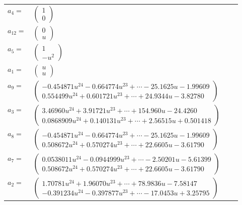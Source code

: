 \documentclass[1p]{elsarticle_modified}
\theoremstyle{definition}
\begin{document}
\begin{tabular}{m{7pt} m{180pt} m{7pt} m{180pt} }
\flushright $a_{4}=$&$\begin{pmatrix}1\\0\end{pmatrix}$ \\
\flushright $a_{12}=$&$\begin{pmatrix}0\\u\end{pmatrix}$ \\
\flushright $a_{5}=$&$\begin{pmatrix}1\\- u^2\end{pmatrix}$ \\
\flushright $a_{1}=$&$\begin{pmatrix}u\\u\end{pmatrix}$ \\
\flushright $a_{9}=$&$\begin{pmatrix}-0.454871 u^{24}-0.664774 u^{23}+\cdots-25.1625 u-1.99609\\0.554499 u^{24}+0.601721 u^{23}+\cdots+24.9344 u-3.82780\end{pmatrix}$ \\
\flushright $a_{3}=$&$\begin{pmatrix}3.46960 u^{24}+3.91721 u^{23}+\cdots+154.960 u-24.4260\\0.0868909 u^{24}+0.140131 u^{23}+\cdots+2.56515 u+0.501418\end{pmatrix}$ \\
\flushright $a_{8}=$&$\begin{pmatrix}-0.454871 u^{24}-0.664774 u^{23}+\cdots-25.1625 u-1.99609\\0.508672 u^{24}+0.570274 u^{23}+\cdots+22.6605 u-3.61790\end{pmatrix}$ \\
\flushright $a_{7}=$&$\begin{pmatrix}0.0538011 u^{24}-0.0944999 u^{23}+\cdots-2.50201 u-5.61399\\0.508672 u^{24}+0.570274 u^{23}+\cdots+22.6605 u-3.61790\end{pmatrix}$ \\
\flushright $a_{2}=$&$\begin{pmatrix}1.70781 u^{24}+1.96070 u^{23}+\cdots+78.9836 u-7.58147\\-0.391234 u^{24}-0.397877 u^{23}+\cdots-17.0453 u+3.25795\end{pmatrix}$ \\

\end{tabular}
\end{document}
